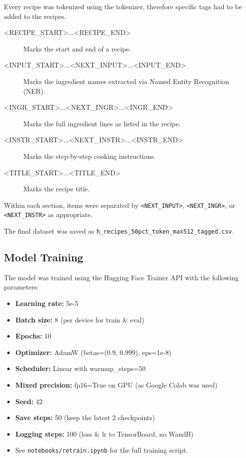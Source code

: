Every recipe was tokenized using the \cite{bien2020recipenlg} tokenizer, therefore specific tags had to be added to the recipes.
\begin{description}
	\item[\textless RECIPE\_START\textgreater...{\textless RECIPE\_END\textgreater}] Marks the start and end of a recipe.
	\item[\textless INPUT\_START\textgreater...\textless NEXT\_INPUT\textgreater...\textless INPUT\_END\textgreater] Marks the ingredient names extracted via Named Entity Recognition (NER).
	\item[\textless INGR\_START\textgreater...\textless NEXT\_INGR\textgreater...\textless INGR\_END\textgreater] Marks the full ingredient lines as listed in the recipe.
	\item[\textless INSTR\_START\textgreater...\textless NEXT\_INSTR\textgreater...\textless INSTR\_END\textgreater] Marks the step-by-step cooking instructions.
	\item[\textless TITLE\_START\textgreater...\textless TITLE\_END\textgreater] Marks the recipe title.
\end{description}

Within each section, items were separated by \texttt{\textless NEXT\_INPUT\textgreater}, \texttt{\textless NEXT\_INGR\textgreater}, or \texttt{\textless NEXT\_INSTR\textgreater} as appropriate.

The final dataset was saved as \texttt{h\_recipes\_50pct\_token\_max512\_tagged.csv}.

\subsection{Model Training}

The model was trained using the Hugging Face \cite{wolf2019huggingface} Trainer API with the following parameters:

\begin{itemize}
	\item \textbf{Learning rate:} 5e-5
	\item \textbf{Batch size:} 8 (per device for train \& eval)
	\item \textbf{Epochs:} 10
	\item \textbf{Optimizer:} AdamW (betas=(0.9, 0.999), eps=1e-8)
	\item \textbf{Scheduler:} Linear with warmup\_steps=50
	\item \textbf{Mixed precision:} fp16=True on GPU (as Google Colab was used)
	\item \textbf{Seed:} 42
	\item \textbf{Save steps:} 50 (keep the latest 2 checkpoints)
	\item \textbf{Logging steps:} 100 (loss \& lr to TensorBoard, no WandB)
	\item See \texttt{notebooks/retrain.ipynb} for the full training script.
\end{itemize}

